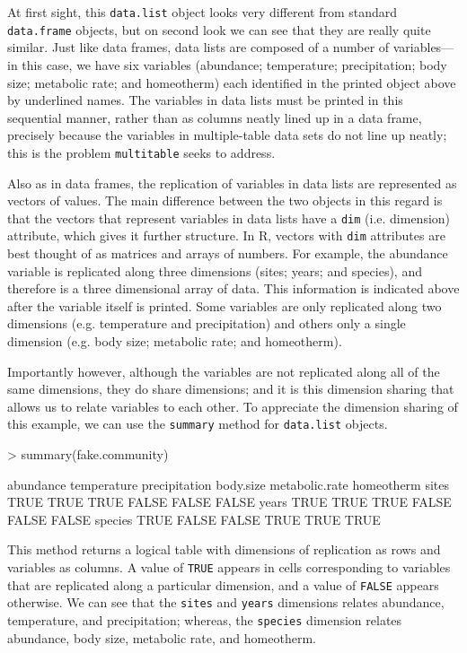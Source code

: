 \documentclass{article}
\newcommand{\R}{{\sf R}}
\newcommand{\code}[1]{\texttt{#1}}
\numberwithin{exercise}{section}
\begin{document}
At first sight, this \code{data.list} object looks very different from standard \code{data.frame} objects, but on second look we can see that they are really quite similar.  Just like data frames, data lists are composed of a number of variables---in this case, we have six variables (abundance; temperature; precipitation; body size; metabolic rate; and homeotherm) each identified in the printed object above by underlined names.  The variables in data lists must be printed in this sequential manner, rather than as columns neatly lined up in a data frame, precisely because the variables in multiple-table data sets do not line up neatly; this is the problem \code{multitable} seeks to address.

Also as in data frames, the replication of variables in data lists are represented as vectors of values.  The main difference between the two objects in this regard is that the vectors that represent variables in data lists have a \code{dim} (i.e. dimension) attribute, which gives it further structure.  In \R, vectors with \code{dim} attributes are best thought of as matrices and arrays of numbers.  For example, the abundance variable is replicated along three dimensions (sites; years; and species), and therefore is a three dimensional array of data.  This information is indicated above after the variable itself is printed.  Some variables are only replicated along two dimensions (e.g. temperature and precipitation) and others only a single dimension (e.g. body size; metabolic rate; and homeotherm).  

Importantly however, although the variables are not replicated along all of the same dimensions, they do share dimensions; and it is this dimension sharing that allows us to relate variables to each other.  To appreciate the dimension sharing of this example, we can use the \code{summary} method for \code{data.list} objects.
\begin{Schunk}
\begin{Sinput}
> summary(fake.community)
\end{Sinput}
\begin{Soutput}
        abundance temperature precipitation body.size metabolic.rate homeotherm
sites        TRUE        TRUE          TRUE     FALSE          FALSE      FALSE
years        TRUE        TRUE          TRUE     FALSE          FALSE      FALSE
species      TRUE       FALSE         FALSE      TRUE           TRUE       TRUE
\end{Soutput}
\end{Schunk}
\noindent This method returns a logical table with dimensions of replication as rows and variables as columns.  A value of \code{TRUE} appears in cells corresponding to variables that are replicated along a particular dimension, and a value of \code{FALSE} appears otherwise.  We can see that the \code{sites} and \code{years} dimensions relates abundance, temperature, and precipitation; whereas, the \code{species} dimension relates abundance, body size, metabolic rate, and homeotherm.
\end{document}
